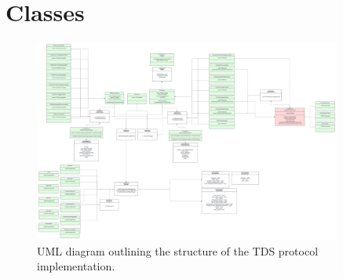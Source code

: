 \documentclass[../design_doc.tex]{subfiles}
\begin{document}
\section{Classes}\label{sec:classes}
    \begin{figure}
        \centering
        \includegraphics[width=0.9\textwidth]{uml_tds.png}
        \caption{UML diagram outlining the structure of the TDS protocol implementation.}\label{fig:tdsuml}
    \end{figure}
\end{document}
